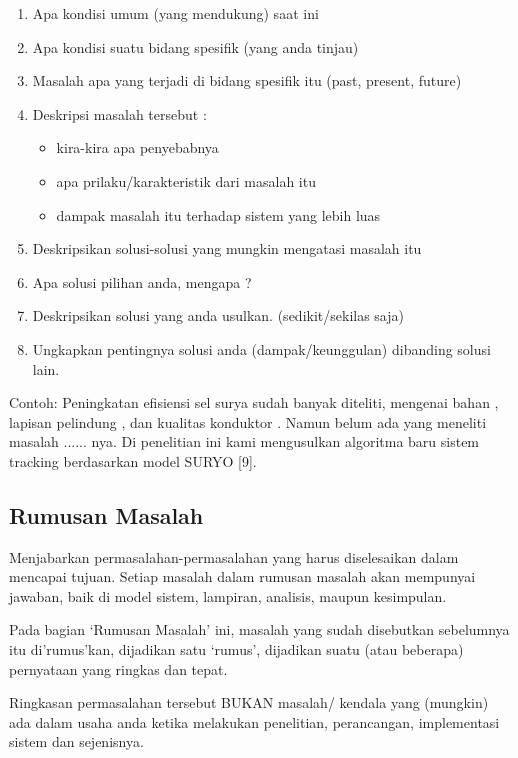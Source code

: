 \documentclass{final_project}
\begin{document}
\renewcommand{\labelitemi}{\textendash}
\begin{enumerate}
    \item Apa kondisi umum (yang mendukung) saat ini
    \item Apa kondisi suatu bidang spesifik (yang anda tinjau)
    \item Masalah apa yang terjadi di bidang spesifik itu (past, present, future)
    \item Deskripsi masalah tersebut :
    \begin{itemize}
        \item kira-kira apa penyebabnya
        \item apa prilaku/karakteristik dari masalah itu
        \item dampak masalah itu terhadap sistem yang lebih luas
    \end{itemize}
    \item Deskripsikan solusi-solusi yang mungkin mengatasi masalah itu
    \item Apa solusi pilihan anda, mengapa ?
    \item Deskripsikan solusi yang anda usulkan. (sedikit/sekilas saja)
    \item Ungkapkan pentingnya solusi anda (dampak/keunggulan) dibanding solusi lain.
\end{enumerate}

Contoh: Peningkatan efisiensi sel surya sudah banyak diteliti, mengenai bahan \cite{1,2}, lapisan pelindung \cite{3,4}, dan kualitas konduktor \cite{5,6}. Namun belum ada yang meneliti masalah ...... nya. Di penelitian ini kami mengusulkan algoritma baru sistem tracking berdasarkan model SURYO [9].
    
\subsection{Rumusan Masalah}

Menjabarkan permasalahan-permasalahan yang harus diselesaikan dalam mencapai tujuan. Setiap masalah dalam rumusan masalah akan mempunyai jawaban, baik di model sistem, lampiran, analisis, maupun kesimpulan. 

Pada bagian ‘Rumusan Masalah’ ini, masalah yang sudah disebutkan sebelumnya itu di’rumus’kan, dijadikan satu ‘rumus’, dijadikan suatu (atau beberapa) pernyataan yang ringkas dan tepat.

Ringkasan permasalahan tersebut BUKAN masalah/ kendala yang (mungkin) ada dalam usaha anda ketika melakukan penelitian, perancangan, implementasi sistem dan sejenisnya.
\end{document}
